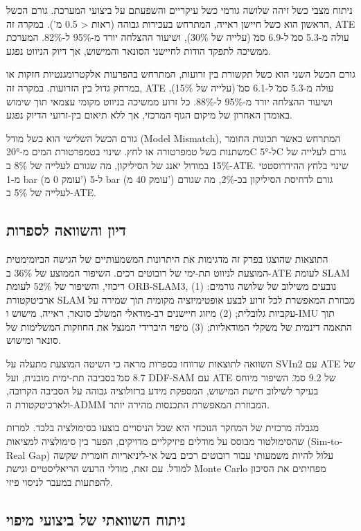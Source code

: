 ניתוח מצבי כשל זיהה שלושה גורמי כשל עיקריים והשפעתם על ביצועי המערכת. גורם הכשל הראשון הוא כשל חיישן ראייה, המתרחש בעכירות גבוהה (ראות < 0.5 מ'). במקרה זה, ATE עולה מ-5.3 ס\"מ ל-6.9 ס\"מ (עלייה של 30\%), ושיעור ההצלחה יורד מ-95\% ל-82\%. המערכת ממשיכה לתפקד הודות לחיישני הסונאר והמישוש, אך דיוק הניווט נפגע.

גורם הכשל השני הוא כשל תקשורת בין זרועות, המתרחש בהפרעות אלקטרומגנטיות חזקות או במרחק גדול בין הזרועות. במקרה זה, ATE עולה מ-5.3 ס\"מ ל-6.1 ס\"מ (עלייה של 15\%), ושיעור ההצלחה יורד מ-95\% ל-88\%. כל זרוע ממשיכה בניווט מקומי עצמאי תוך שימוש באומדן האחרון של מיקום הגוף המרכזי, אך ללא תיאום בין-זרועי הדיוק נפגע.

גורם הכשל השלישי הוא כשל מודל (Model Mismatch), המתרחש כאשר תכונות החומר משתנות בשל טמפרטורה או לחץ. שינוי בטמפרטורת המים מ-20°C ל-5°C גורם לעלייה של 15\% במודול יאנג של הסיליקון, מה שגורם לעלייה של 8\% ב-ATE. שינוי בלחץ ההידרוסטטי מ-1 bar (עומק 0 מ') ל-5 bar (עומק 40 מ') גורם לדחיסת הסיליקון בכ-2\%, מה שגורם לעלייה של 5\% ב-ATE.

\subsection{דיון והשוואה לספרות}
\label{sec:ch08_discussion}

התוצאות שהוצגו בפרק זה מדגימות את היתרונות המשמעותיים של הגישה הביומימטית המוצעת לניווט תת-ימי של רובוטים רכים. השיפור הממוצע של 36\% ב-ATE לעומת SLAM ריכוזי, והשיפור של 52\% לעומת ORB-SLAM3, נובעים משילוב של שלושה גורמים: (1) ארכיטקטורת SLAM מבוזרת המאפשרת לכל זרוע לבצע אופטימיזציה מקומית תוך שמירה על עקביות גלובלית; (2) מיזוג חיישנים רב-מודאלי המשלב סונאר, ראייה, מישוש ו-IMU תוך התאמה דינמית של משקלי המודאליות; (3) מיפוי היברידי המנצל את החוזקות המשלימות של סונאר ומישוש.

השוואה לתוצאות שדווחו בספרות מראה כי השיטה המוצעת מתעלה על SVIn2 \cite{Rahman2019} עם ATE של 8.7 ס\"מ בסביבה תת-ימית מובנית, ועל DDF-SAM \cite{Cunningham2010} עם ATE של 9.2 ס\"מ. השיפור מיוחס בעיקר לשילוב חישת המישוש, המספקת מידע ברזולוציה גבוהה על הסביבה הקרובה, ולארכיטקטורת ה-ADMM המבוזרת המאפשרת התכנסות מהירה יותר.

מגבלה מרכזית של המחקר הנוכחי היא שכל הניסויים בוצעו בסימולציה בלבד. למרות שהסימולטור מבוסס על מודלים פיזיקליים מדויקים, הפער בין סימולציה למציאות (Sim-to-Real Gap) עלול להיות משמעותי עבור רובוטים רכים בשל אי-ליניאריות חומרית שקשה למודל. עם זאת, מודלי הרעש הריאליסטיים וגישת Monte Carlo מפחיתים את הסיכון להפתעות במעבר לניסוי פיזי.

\subsection{ניתוח השוואתי של ביצועי מיפוי}
\label{sec:ch08_mapping_comparison}

